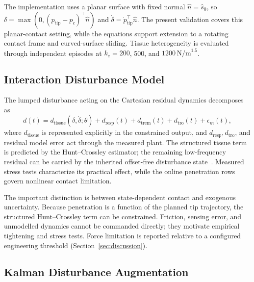 The implementation uses a planar surface with fixed normal $\hat n=\hat s_0$, so $\delta=\max(0,(p_{\text{tip}}-p_c)^\top\hat n)$ and $\dot\delta=\dot p_{\text{tip}}^\top\hat n$. The present validation covers this planar-contact setting, while the equations support extension to a rotating contact frame and curved-surface sliding. Tissue heterogeneity is evaluated through independent episodes at $k_e=200$, 500, and $1200\,\mathrm{N/m}^{1.5}$.

\subsection{Interaction Disturbance Model}\label{sec:dist}

The lumped disturbance acting on the Cartesian residual dynamics decomposes as
\begin{equation}
d(t) = d_{\text{tissue}}(\delta, \dot{\delta}; \theta) + d_{\text{resp}}(t) + d_{\text{trem}}(t) + d_{\text{tro}}(t) + \epsilon_m(t),
\label{eq:dist}
\end{equation}
where $d_{\text{tissue}}$ is represented explicitly in the constrained output, and $d_{\text{resp}},d_{\text{tro}}$, and residual model error act through the measured plant. The structured tissue term is predicted by the Hunt--Crossley estimator; the remaining low-frequency residual can be carried by the inherited offset-free disturbance state~\cite{pannocchia2003,rawlings2017}. Measured stress tests characterize its practical effect, while the online penetration rows govern nonlinear contact limitation.

The important distinction is between state-dependent contact and exogenous uncertainty. Because penetration is a function of the planned tip trajectory, the structured Hunt--Crossley term can be constrained. Friction, sensing error, and unmodelled dynamics cannot be commanded directly; they motivate empirical tightening and stress tests. Force limitation is reported relative to a configured engineering threshold (Section~\ref{sec:discussion}).

\subsection{Kalman Disturbance Augmentation}\label{sec:kalman}

